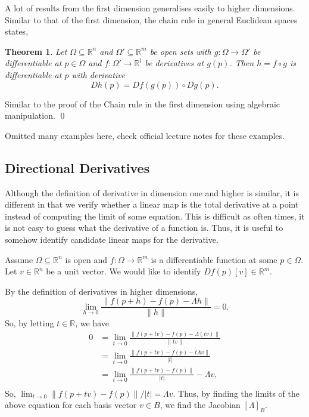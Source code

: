 \documentclass[
]{article}
\newtheorem{theorem}{Theorem}
\theoremstyle{definition}
\begin{document}
A lot of results from the first dimension generalises easily to higher
dimensions. Similar to that of the first dimension, the chain rule in
general Euclidean spaces states,

\begin{theorem}
  Let \(\Omega \subseteq \mathbb{R}^n\) and \(\Omega' \subseteq \mathbb{R}^m\) 
  be open sets with \(g : \Omega \to \Omega'\) be differentiable at \(p \in \Omega\) 
  and \(f : \Omega' \to \mathbb{R}^l\) be derivatives at \(g(p)\). Then 
  \(h = f \circ g\) is differentiable at \(p\) with derivative 
  \[Dh(p) = Df(g(p)) \circ Dg(p).\] 
\end{theorem}
\proof

Similar to the proof of the Chain rule in the first dimension using
algebraic manipulation. \qed

Omitted many examples here, check official lecture notes for these
examples.

\hypertarget{directional-derivatives}{%
\subsection{Directional Derivatives}\label{directional-derivatives}}

Although the definition of derivative in dimension one and higher is
similar, it is different in that we verify whether a linear map is the
total derivative at a point instead of computing the limit of some
equation. This is difficult as often times, it is not easy to guess what
the derivative of a function is. Thus, it is useful to somehow identify
candidate linear maps for the derivative.

Assume \(\Omega \subseteq \mathbb{R}^n\) is open and
\(f : \Omega \to \mathbb{R}^m\) is a differentiable function at some
\(p \in \Omega\). Let \(v \in \mathbb{R}^n\) be a unit vector. We would
like to identify \(Df(p)[v] \in \mathbb{R}^m\).

By the definition of derivatives in higher dimensions,
\[\lim_{h \to 0} \frac{\|f(p + h) - f(p) - \Lambda h\|}{\| h \|} = 0. \]
So, by letting \(t \in \mathbb{R}\), we have \begin{align*}
  0 & = \lim_{t \to 0} \frac{\|f(p + tv) - f(p) - \Lambda (tv)\|}{\| tv \|}\\
    & = \lim_{t \to 0} \frac{\|f(p + tv) - f(p) - t\Lambda v\|}{\left| t \right|}\\
    & = \lim_{t \to 0} \frac{\|f(p + tv) - f(p)\|}{\left|t\right|} - 
        \Lambda v,\\
\end{align*} So,
\(\lim_{t \to 0} \|f(p + tv) - f(p)\| / \left|t\right| = \Lambda v\).
Thus, by finding the limits of the above equation for each basis vector
\(v \in B\), we find the Jacobian \([\Lambda]_B\).
\end{document}

